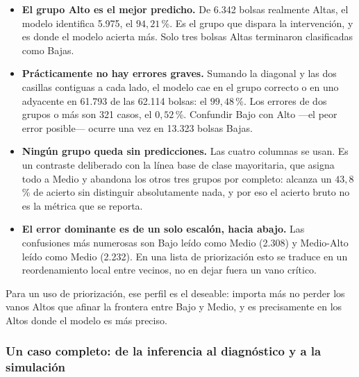 \documentclass[11pt,a4paper]{article}
\begin{document}
\begin{bloquenuevo}
\begin{itemize}[itemsep=0.25em]
  \item \textbf{El grupo Alto es el mejor predicho.} De 6.342 bolsas realmente Altas, el modelo
        identifica 5.975, el $94{,}21$\,\%. Es el grupo que dispara la intervención, y es donde
        el modelo acierta más. Solo tres bolsas Altas terminaron clasificadas como Bajas.
  \item \textbf{Prácticamente no hay errores graves.} Sumando la diagonal y las dos casillas
        contiguas a cada lado, el modelo cae en el grupo correcto o en uno adyacente en 61.793
        de las 62.114 bolsas: el $99{,}48$\,\%. Los errores de dos grupos o más son 321 casos,
        el $0{,}52$\,\%. Confundir Bajo con Alto ---el peor error posible--- ocurre una vez en
        13.323 bolsas Bajas.
  \item \textbf{Ningún grupo queda sin predicciones.} Las cuatro columnas se usan. Es un
        contraste deliberado con la línea base de clase mayoritaria, que asigna todo a Medio y
        abandona los otros tres grupos por completo: alcanza un $43{,}8$\,\% de acierto sin
        distinguir absolutamente nada, y por eso el acierto bruto no es la métrica que se
        reporta.
  \item \textbf{El error dominante es de un solo escalón, hacia abajo.} Las confusiones más
        numerosas son Bajo leído como Medio (2.308) y Medio-Alto leído como Medio (2.232). En
        una lista de priorización esto se traduce en un reordenamiento local entre vecinos, no
        en dejar fuera un vano crítico.
\end{itemize}

Para un uso de priorización, ese perfil es el deseable: importa más no perder los vanos Altos
que afinar la frontera entre Bajo y Medio, y es precisamente en los Altos donde el modelo es
más preciso.
\end{bloquenuevo}

\subsubsection{Un caso completo: de la inferencia al diagnóstico y a la simulación}
\end{document}
